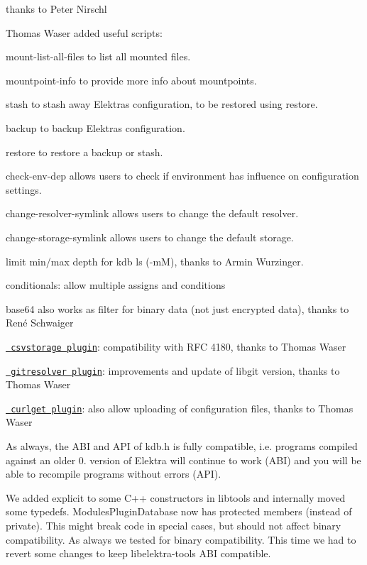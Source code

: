 \begin{DoxyItemize}
\begin{DoxyItemize}
\item thanks to Peter Nirschl
\end{DoxyItemize}
\item Thomas Waser added useful scripts\+:
\begin{DoxyItemize}
\item mount-\/list-\/all-\/files to list all mounted files.
\item mountpoint-\/info to provide more info about mountpoints.
\item stash to stash away Elektra\textquotesingle{}s configuration, to be restored using {\ttfamily restore}.
\item backup to backup Elektra\textquotesingle{}s configuration.
\item restore to restore a backup or stash.
\item check-\/env-\/dep allows users to check if environment has influence on configuration settings.
\item change-\/resolver-\/symlink allows users to change the default resolver.
\item change-\/storage-\/symlink allows users to change the default storage.
\end{DoxyItemize}
\item limit min/max depth for {\ttfamily kdb ls} ({\ttfamily -\/mM}), thanks to Armin Wurzinger.
\item conditionals\+: allow multiple assigns and conditions
\item base64 also works as filter for binary data (not just encrypted data), thanks to René Schwaiger
\item \href{https://www.libelektra.org/plugins/csvstorage}{\texttt{ csvstorage plugin}}\+: compatibility with R\+FC 4180, thanks to Thomas Waser
\item \href{https://www.libelektra.org/plugins/gitresolver}{\texttt{ gitresolver plugin}}\+: improvements and update of libgit version, thanks to Thomas Waser
\item \href{https://www.libelektra.org/plugins/curlget}{\texttt{ curlget plugin}}\+: also allow uploading of configuration files, thanks to Thomas Waser
\end{DoxyItemize}

As always, the A\+BI and A\+PI of kdb.\+h is fully compatible, i.\+e. programs compiled against an older 0. version of Elektra will continue to work (A\+BI) and you will be able to recompile programs without errors (A\+PI).

We added {\ttfamily explicit} to some C++ constructors in libtools and internally moved some typedefs. Modules\+Plugin\+Database now has protected members (instead of private). This might break code in special cases, but should not affect binary compatibility. As always we tested for binary compatibility. This time we had to revert some changes to keep libelektra-\/tools A\+BI compatible.

